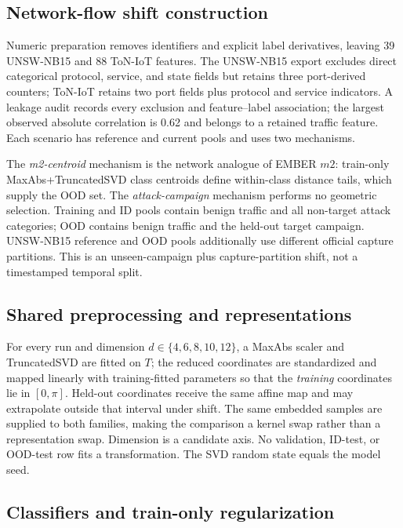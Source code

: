\documentclass[referee,lineno,pdflatex,sn-vancouver-num]{sn-jnl}
\theoremstyle{thmstyleone}%
\theoremstyle{thmstyletwo}%
\theoremstyle{thmstylethree}%
\begin{document}
\subsection{Network-flow shift construction}

Numeric preparation removes identifiers and explicit label derivatives, leaving 39 UNSW-NB15 and 88 ToN-IoT features. The UNSW-NB15 export excludes direct categorical protocol, service, and state fields but retains three port-derived counters; ToN-IoT retains two port fields plus protocol and service indicators. A leakage audit records every exclusion and feature--label association; the largest observed absolute correlation is 0.62 and belongs to a retained traffic feature. Each scenario has reference and current pools and uses two mechanisms.

The \emph{m2-centroid} mechanism is the network analogue of EMBER $m2$: train-only MaxAbs+TruncatedSVD class centroids define within-class distance tails, which supply the OOD set. The \emph{attack-campaign} mechanism performs no geometric selection. Training and ID pools contain benign traffic and all non-target attack categories; OOD contains benign traffic and the held-out target campaign. UNSW-NB15 reference and OOD pools additionally use different official capture partitions. This is an unseen-campaign plus capture-partition shift, not a timestamped temporal split.

\subsection{Shared preprocessing and representations}

For every run and dimension $d\in\{4,6,8,10,12\}$, a MaxAbs scaler and TruncatedSVD are fitted on $T$; the reduced coordinates are standardized and mapped linearly with training-fitted parameters so that the \emph{training} coordinates lie in $[0,\pi]$. Held-out coordinates receive the same affine map and may extrapolate outside that interval under shift. The same embedded samples are supplied to both families, making the comparison a kernel swap rather than a representation swap. Dimension is a candidate axis. No validation, ID-test, or OOD-test row fits a transformation. The SVD random state equals the model seed.

\subsection{Classifiers and train-only regularization}
\end{document}
